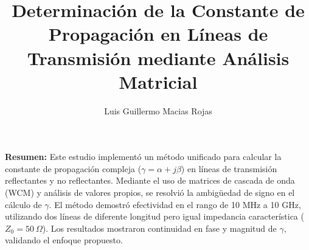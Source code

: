 \documentclass{article}   %
\title{Determinación de la Constante de Propagación en Líneas de Transmisión mediante Análisis Matricial}
\author{Luis Guillermo Macias Rojas}
\theoremstyle{mytheoremstyle}
\theoremstyle{mytheoremstyle}
\theoremstyle{myproblemstyle}
\begin{document}
    \maketitle

    \selectfont %
    \noindent
    \textbf{Resumen:} Este estudio implementó un método unificado para calcular la constante de propagación compleja ($\gamma = \alpha + j\beta$) en líneas de 
    transmisión reflectantes y no reflectantes. Mediante el uso de matrices de cascada de onda (WCM) y análisis de valores propios, se resolvió la ambigüedad de signo 
    en el cálculo de $\gamma$. El método demostró efectividad en el rango de 10 MHz a 10 GHz, utilizando dos líneas de diferente longitud pero igual impedancia 
    característica ($Z_0 = 50\ \Omega$). Los resultados mostraron continuidad en fase y magnitud de $\gamma$, validando el enfoque propuesto.
\end{document}
